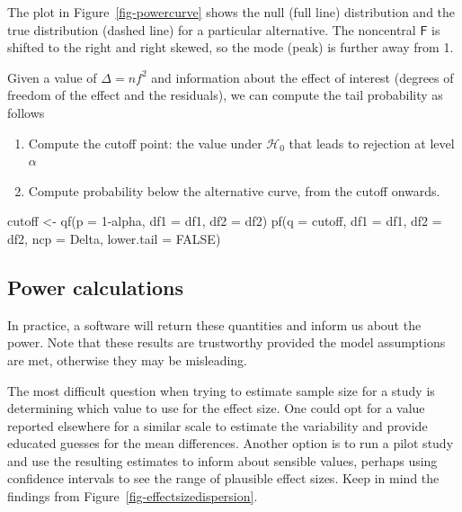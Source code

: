 \documentclass[
  11pt,
  letterpaper,
]{scrbook}
\newenvironment{Shaded}{\begin{snugshade}}{\end{snugshade}}
\newcommand{\AttributeTok}[1]{\textcolor[rgb]{0.40,0.45,0.13}{#1}}
\newcommand{\ConstantTok}[1]{\textcolor[rgb]{0.56,0.35,0.01}{#1}}
\newcommand{\DecValTok}[1]{\textcolor[rgb]{0.68,0.00,0.00}{#1}}
\newcommand{\FunctionTok}[1]{\textcolor[rgb]{0.28,0.35,0.67}{#1}}
\newcommand{\NormalTok}[1]{\textcolor[rgb]{0.00,0.23,0.31}{#1}}
\newcommand{\OtherTok}[1]{\textcolor[rgb]{0.00,0.23,0.31}{#1}}
\newcommand{\SpecialCharTok}[1]{\textcolor[rgb]{0.37,0.37,0.37}{#1}}
\providecommand{\tightlist}{%
  \setlength{\itemsep}{0pt}\setlength{\parskip}{0pt}}\usepackage{longtable,booktabs,array}
\theoremstyle{definition}
\theoremstyle{remark}
\begin{document}
The plot in Figure~\ref{fig-powercurve} shows the null (full line)
distribution and the true distribution (dashed line) for a particular
alternative. The noncentral \(\mathsf{F}\) is shifted to the right and
right skewed, so the mode (peak) is further away from 1.

Given a value of \(\Delta=nf^2\) and information about the effect of
interest (degrees of freedom of the effect and the residuals), we can
compute the tail probability as follows

\begin{enumerate}
\def\labelenumi{\arabic{enumi}.}
\tightlist
\item
  Compute the cutoff point: the value under \(\mathscr{H}_0\) that leads
  to rejection at level \(\alpha\)
\item
  Compute probability below the alternative curve, from the cutoff
  onwards.
\end{enumerate}

\begin{Shaded}
\begin{Highlighting}[]
\NormalTok{cutoff }\OtherTok{\textless{}{-}} \FunctionTok{qf}\NormalTok{(}\AttributeTok{p =} \DecValTok{1}\SpecialCharTok{{-}}\NormalTok{alpha, }\AttributeTok{df1 =}\NormalTok{ df1, }\AttributeTok{df2 =}\NormalTok{ df2)}
\FunctionTok{pf}\NormalTok{(}\AttributeTok{q =}\NormalTok{ cutoff,  }\AttributeTok{df1 =}\NormalTok{ df1, }\AttributeTok{df2 =}\NormalTok{ df2, }
    \AttributeTok{ncp =}\NormalTok{ Delta, }\AttributeTok{lower.tail =} \ConstantTok{FALSE}\NormalTok{)}
\end{Highlighting}
\end{Shaded}

\hypertarget{power-calculations}{%
\subsection{Power calculations}\label{power-calculations}}

In practice, a software will return these quantities and inform us about
the power. Note that these results are trustworthy provided the model
assumptions are met, otherwise they may be misleading.

The most difficult question when trying to estimate sample size for a
study is determining which value to use for the effect size. One could
opt for a value reported elsewhere for a similar scale to estimate the
variability and provide educated guesses for the mean differences.
Another option is to run a pilot study and use the resulting estimates
to inform about sensible values, perhaps using confidence intervals to
see the range of plausible effect sizes. Keep in mind the findings from
Figure~\ref{fig-effectsizedispersion}.
\end{document}
